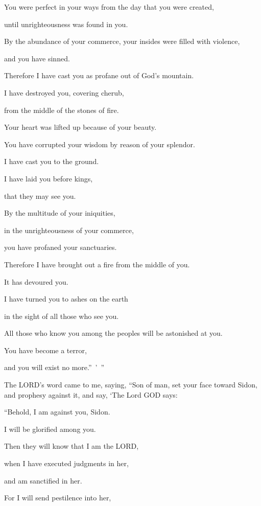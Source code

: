 \myverse{}You were perfect in your ways from the day that you were created,

until unrighteousness was found in you.

\myverse{}By the abundance of your commerce, your insides were filled
with violence,

and you have sinned.

Therefore I have cast you as profane out of God’s mountain.

I have destroyed you, covering cherub,

from the middle of the stones of fire.

\myverse{}Your heart was lifted up because of your beauty.

You have corrupted your wisdom by reason of your splendor.

I have cast you to the ground.

I have laid you before kings,

that they may see you.

\myverse{}By the multitude of your iniquities,

in the unrighteousness of your commerce,

you have profaned your sanctuaries.

Therefore I have brought out a fire from the middle of you.

It has devoured you.

I have turned you to ashes on the earth

in the sight of all those who see you.

\myverse{}All those who know you among the peoples will be astonished
at you.

You have become a terror,

and you will exist no more.” ’ ”


\vspace{\baselineskip} \myverse{}The LORD’s word came to me, saying,
\myverse{}“Son of man, set your face toward Sidon, and prophesy against it,
\myverse{}and say, ‘The Lord GOD says:

“Behold, I am against you, Sidon.

I will be glorified among you.

Then they will know that I am the LORD,

when I have executed judgments in her,

and am sanctified in her.

\myverse{}For I will send pestilence into her,


